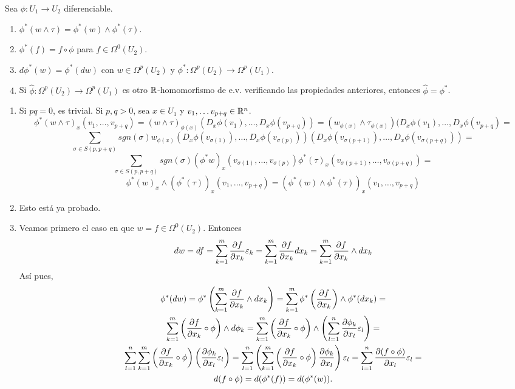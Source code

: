 \documentclass[CV.tex]{subfiles}
\begin{document}
\begin{teorema}
Sea $\phi:U_1\to U_2$ diferenciable.
\begin{enumerate}
\item $\phi^*(w\land\tau)=\phi^*(w)\land\phi^*(\tau)$.
\item $\phi^*(f)=f\circ\phi$ para $f\in\Omega^0(U_2)$.
\item $d\phi^*(w)=\phi^*(dw)$ con $w\in\Omega^p(U_2)$ y $\phi^*:\Omega^p(U_2)\to\Omega^p(U_1)$.
\item Si $\hat{\phi}:\Omega^p(U_2)\to\Omega^p(U_1)$ es otro $\mathbb{R}$-homomorfismo de e.v. verificando las propiedades anteriores, entonces $\hat{\phi}=\phi^*$.
\end{enumerate}
\end{teorema}
\begin{dem}
\begin{enumerate}
\item Si $pq=0$, es trivial. Si $p,q>0$, sea $x\in U_1$ y $v_1,\dots v_{p+q}\in\mathbb{R}^n$.
\[
\phi^*(w\land\tau)_x(v_1,\dots, v_{p+q})=(w\land\tau)_{\phi(x)}(D_x\phi(v_1),\dots, D_x\phi(v_{p+q}))=(w_{\phi(x)}\land\tau_{\phi(x)})(D_x\phi(v_1),\dots, D_x\phi(v_{p+q})=
\]
\[
\sum_{\sigma\in S(p,p+q)}sgn(\sigma)w_{\phi(x)}(D_x\phi(v_{\sigma(1)}),\dots, D_x\phi(v_{\sigma(p)}))(D_x\phi(v_{\sigma(p+1)}),\dots, D_x\phi(v_{\sigma(p+q)}))=
\]
\[
\sum_{\sigma\in S(p,p+q)}sgn(\sigma)(\phi^*w)_x(v_{\sigma(1)},\dots, v_{\sigma(p)})\phi^*(\tau)_x(v_{\sigma(p+1)},\dots, v_{\sigma(p+q)})=
\]
\[
\phi^*(w)_x\land (\phi^*(\tau))_x(v_1,\dots, v_{p+q})=(\phi^*(w)\land \phi^*(\tau))_x(v_1,\dots, v_{p+q})
\]

\item Esto está ya probado.

\item Veamos primero el caso en que $w=f\in\Omega^0(U_2)$. Entonces 
\[
dw=df=\sum_{k=1}^m\frac{\partial f}{\partial x_k}\varepsilon_k=\sum_{k=1}^m\frac{\partial f}{\partial x_k}dx_k=\sum_{k=1}^m\frac{\partial f}{\partial x_k}\land dx_k
\]
Así pues,
\begin{gather*}
\phi^*(dw)=\phi^*\left(\sum_{k=1}^m\frac{\partial f}{\partial x_k}\land dx_k\right)=\sum_{k=1}^m\phi^*\left(\frac{\partial f}{\partial x_k}\right)\land\phi^*(dx_k)=\\
\sum_{k=1}^m\left(\frac{\partial f}{\partial x_k}\circ\phi \right)\land d\phi_k=\sum_{k=1}^m\left(\frac{\partial f}{\partial x_k}\circ\phi\right)\land \left(\sum_{l=1}^n\frac{\partial \phi_k}{\partial x_l}\varepsilon_l\right)=\\
\sum_{l=1}^n\sum_{k=1}^m\left(\frac{\partial f}{\partial x_k}\circ\phi\right)\left(\frac{\partial \phi_k}{\partial x_l}\varepsilon_l\right)=\sum_{l=1}^n\left(\sum_{k=1}^m\left(\frac{\partial f}{\partial x_k}\circ\phi\right)\frac{\partial \phi_k}{\partial x_l}\right)\varepsilon_l=\sum_{l=1}^n\frac{\partial (f\circ\phi)}{\partial x_l}\varepsilon_l=\\
d(f\circ\phi)=d(\phi^*(f))=d(\phi^*(w)).
\end{gather*}


\end{enumerate}
\end{dem}
\end{document}
